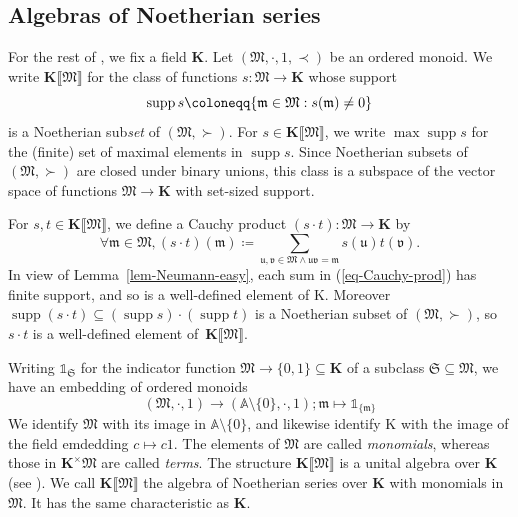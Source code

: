 \documentclass{article}
\newcommand{\Kappa}{\mathrm{K}}
\newcommand{\assign}{\coloneqq}
\newcommand{\of}{:}
\newcommand{\suchthat}{:}
\newcommand{\tmem}[1]{{\em #1\/}}
\newcommand{\tmmathbf}[1]{\ensuremath{\boldsymbol{#1}}}
\newcommand{\tmop}[1]{\ensuremath{\operatorname{#1}}}
\theoremstyle{remark}\newtheorem*{convention*}{Convention}
\begin{document}
\subsection{Algebras of Noetherian series}\label{subsection-Noetherian-series}

For the rest of , we fix a field $\mathbf{K}$.
Let $(\mathfrak{M}, \cdot, 1, \prec)$ be an ordered monoid. We write
$\mathbf{K} \llbracket \mathfrak{M} \rrbracket$\label{autolab4} for the class
of functions $s \of \mathfrak{M} \longrightarrow \mathbf{K}$ whose support
\[ \tmop{supp} s \assign \{ \mathfrak{m} \in \mathfrak{M} \suchthat s
   (\mathfrak{m}) \neq 0 \} \text{\label{autolab5}} \]
is a Noetherian sub{\tmem{set}} of $(\mathfrak{M}, \succ)$. For $s \in
\mathbf{K} \llbracket \mathfrak{M} \rrbracket$, we write $\max \tmop{supp} s$
for the (finite) set of maximal elements in $\tmop{supp} s$. Since Noetherian
subsets of $(\mathfrak{M}, \succ)$ are closed under binary unions, this class
is a subspace of the vector space of functions $\mathfrak{M} \longrightarrow
\mathbf{K}$ with set-sized support.

For $s, t \in \mathbf{K} \llbracket \mathfrak{M} \rrbracket$, we define a Cauchy
product $(s \cdot t) \of \mathfrak{M} \longrightarrow \mathbf{K}$ by
\begin{equation}
  \forall \mathfrak{m} \in \mathfrak{M}, (s \cdot t) (\mathfrak{m}) \assign
  \sum_{\mathfrak{u}, \mathfrak{v} \in \mathfrak{M} \wedge
  \mathfrak{u}\mathfrak{v}=\mathfrak{m}} s (\mathfrak{u}) t (\mathfrak{v}) .
  \label{eq-Cauchy-prod}
\end{equation}
In view of Lemma~\ref{lem-Neumann-easy}, each sum in (\ref{eq-Cauchy-prod}) has
finite support, and so is a well-defined element of $\tmmathbf{\Kappa}$.
Moreover $\tmop{supp} (s \cdot t) \subseteq (\tmop{supp} s) \cdot (\tmop{supp}
t)$ is a Noetherian subset of $(\mathfrak{M}, \succ)$, so $s \cdot t$ is a
well-defined element of~$\mathbf{K} \llbracket \mathfrak{M} \rrbracket$.

Writing $\mathbb{1}_{\mathfrak{S}}$ for the indicator function $\mathfrak{M}
\longrightarrow \{0, 1\} \subseteq \mathbf{K}$ of a subclass $\mathfrak{S}
\subseteq \mathfrak{M}$, we have an embedding of ordered monoids
\[ (\mathfrak{M}, \cdot, 1) \longrightarrow (\mathbb{A} \setminus \{0\},
   \cdot, 1) ; \mathfrak{m} \mapsto \mathbb{1}_{\{\mathfrak{m}\}} \]
We identify $\mathfrak{M}$ with its image in $\mathbb{A} \setminus \{0\}$, and
likewise identify $\tmmathbf{\Kappa}$ with the image of the field emdedding $c
\mapsto c 1$. The elements of $\mathfrak{M}$ are called
{\tmem{monomials}}{}, whereas those in $\mathbf{K}^{\times}
\mathfrak{M}$ are called {\tmem{terms}}{}. The structure
$\mathbf{K} \llbracket \mathfrak{M} \rrbracket$ is a unital algebra over
$\mathbf{K}$ (see {\cite[Proposition~3.9]{BKKMP:strong}}). We call $\mathbf{K}
\llbracket \mathfrak{M} \rrbracket$ the algebra of Noetherian series over
$\mathbf{K}$ with monomials in $\mathfrak{M}$. It has the same characteristic
as $\mathbf{K}$.
\end{document}
